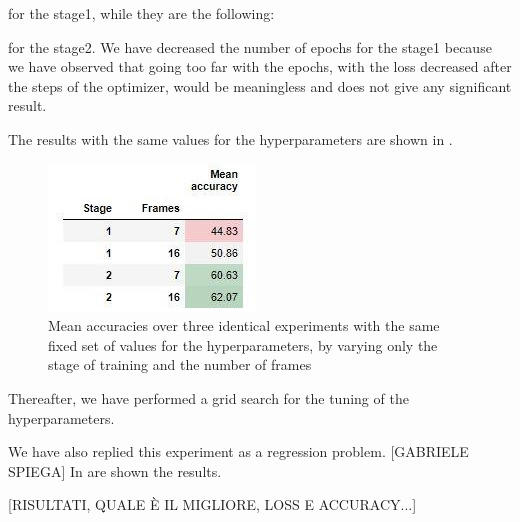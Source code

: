 \documentclass[10pt,twocolumn,hidelinks,letterpaper]{article}
\begin{document}
for the stage1, while they are the following:

\begin{center}
\end{center}

for the stage2. We have decreased the number of epochs for the stage1 because we have observed that going too far with the epochs, with the loss decreased after the steps of the optimizer, would be meaningless and does not give any significant result.

The results with the same values for the hyperparameters are shown in .

\begin{figure}[t]
	\centering
	\includegraphics[width=.6\linewidth]{images/step2.1_table.jpg}
	\caption{Mean accuracies over three identical experiments with the same fixed set of values for the hyperparameters, by varying only the stage of training and the number of frames}
	\label{ms_table}
\end{figure}

Thereafter, we have performed a grid search for the tuning of the hyperparameters.

We have also replied this experiment as a regression problem.
[GABRIELE SPIEGA]
In  are shown the results.

[RISULTATI, QUALE È IL MIGLIORE, LOSS E ACCURACY...]
\end{document}

